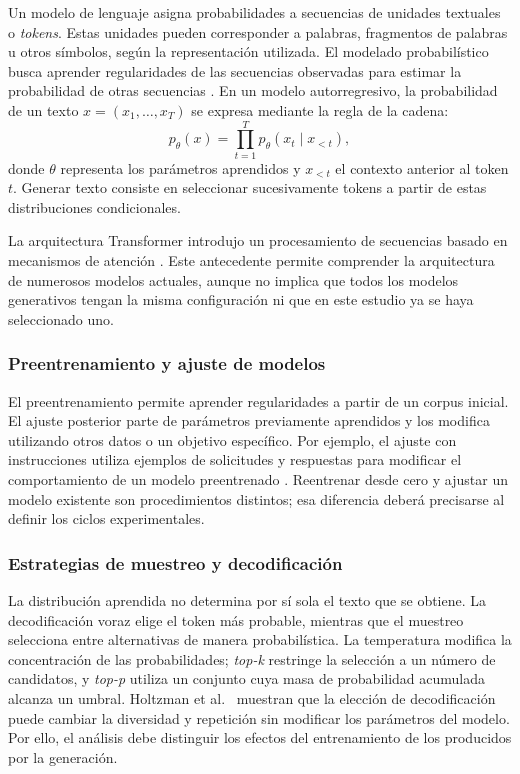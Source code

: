 \documentclass[12pt,letterpaper]{article}
\begin{document}
Un modelo de lenguaje asigna probabilidades a secuencias de unidades
textuales o \textit{tokens}. Estas unidades pueden corresponder a palabras,
fragmentos de palabras u otros símbolos, según la representación utilizada.
El modelado probabilístico busca aprender regularidades de las secuencias
observadas para estimar la probabilidad de otras secuencias
\cite{bengio2003}. En un modelo autorregresivo, la probabilidad de un texto
\(x=(x_1,\ldots,x_T)\) se expresa mediante la regla de la cadena:
\begin{equation}
    p_{\theta}(x)=\prod_{t=1}^{T}p_{\theta}(x_t\mid x_{<t}),
\end{equation}
donde \(\theta\) representa los parámetros aprendidos y \(x_{<t}\) el contexto
anterior al token \(t\). Generar texto consiste en seleccionar sucesivamente
tokens a partir de estas distribuciones condicionales.

La arquitectura Transformer introdujo un procesamiento de secuencias basado
en mecanismos de atención \cite{vaswani2017}. Este antecedente permite
comprender la arquitectura de numerosos modelos actuales, aunque no implica
que todos los modelos generativos tengan la misma configuración ni que en
este estudio ya se haya seleccionado uno.

\subsubsection{Preentrenamiento y ajuste de modelos}

El preentrenamiento permite aprender regularidades a partir de un corpus
inicial. El ajuste posterior parte de parámetros previamente aprendidos y
los modifica utilizando otros datos o un objetivo específico. Por ejemplo,
el ajuste con instrucciones utiliza ejemplos de solicitudes y respuestas
para modificar el comportamiento de un modelo preentrenado
\cite{wang2023selfinstruct}. Reentrenar desde cero y ajustar un modelo
existente son procedimientos distintos; esa diferencia deberá precisarse
al definir los ciclos experimentales.

\subsubsection{Estrategias de muestreo y decodificación}

La distribución aprendida no determina por sí sola el texto que se obtiene.
La decodificación voraz elige el token más probable, mientras que el muestreo
selecciona entre alternativas de manera probabilística. La temperatura
modifica la concentración de las probabilidades; \textit{top-k} restringe
la selección a un número de candidatos, y \textit{top-p} utiliza un conjunto
cuya masa de probabilidad acumulada alcanza un umbral. Holtzman et al.\
\cite{holtzman2020} muestran que la elección de decodificación puede cambiar
la diversidad y repetición sin modificar los parámetros del modelo.
Por ello, el análisis debe distinguir los efectos del entrenamiento de los
producidos por la generación.
\end{document}

